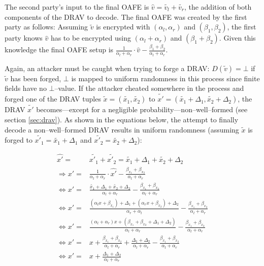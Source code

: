 The second party's input to the final OAFE is $\widehat{v} = \widetilde{v_l} +
\widetilde{v_r}$, the addition of both components of the DRAV to decode.  The
final OAFE was created by the first party as follows: Assuming $\widetilde{v}$
is encrypted with $(\alpha_l, \alpha_r)$ and $(\beta_1, \beta_2)$, the first
party knows $\widehat{v}$ has to be encrypted using $(\alpha_l + \alpha_r)$ and
$(\beta_1 + \beta_2)$.  Given this knowledge the final OAFE setup is
$\frac{1}{\alpha_l + \alpha_r} \cdot \widehat{v} - \frac{\beta_1 +
\beta_2}{\alpha_l + \alpha_r}$.

Again, an attacker must be caught when trying to forge a DRAV: $D(\widetilde{v})
= \bot$ if $\widetilde{v}$ has been forged, $\bot$ is mapped to uniform
randomness in this process since finite fields have no $\bot$--value. If the
attacker cheated somewhere in the process and forged one of the DRAV tuples
$\widetilde{x} = (\widetilde{x_1}, \widetilde{x_2})$ to $\widetilde{x'} =
(\widetilde{x_1} + \Delta_1, \widetilde{x_2} + \Delta_2)$, the DRAV
$\widetilde{x'}$ becomes---except for a negligible
probability---non--well--formed (see section \ref{sec:drav}). As shown in the
equations below, the attempt to finally decode a non--well--formed DRAV results
in uniform randomness (assuming $\widetilde{x}$ is forged to $\widetilde{x'_1} =
\widetilde{x_1} + \Delta_1$ and $\widetilde{x'_2} = \widetilde{x_2} +
\Delta_2$):

\begin{align*}
  \widehat{x'} = & \widetilde{x'_1} + \widetilde{x'_2} = \widetilde{x_1} +
  \Delta_1 + \widetilde{x_2} + \Delta_2 \\
  \Rightarrow x' = & \frac{1}{\alpha_l + \alpha_r} \cdot \widehat{x'} -
  \frac{\beta_{x_1} +
  \beta_{x_2}}{\alpha_l + \alpha_r} \\
  \Leftrightarrow x' = & \frac{\widetilde{x_1} + \Delta_1 +
  \widetilde{x_2} + \Delta_2}{\alpha_l + \alpha_r} -
  \frac{\beta_{x_1} +\beta_{x_2}}{\alpha_l + \alpha_r}\\
  \Leftrightarrow x' = & \frac{(\alpha_l x + \beta_{x_1}) + \Delta_1 +
  (\alpha_r x + \beta_{x_2}) + \Delta_2}{\alpha_r + \alpha_l} -
  \frac{\beta_{x_1} +\beta_{x_2}}{\alpha_l + \alpha_r} \\
  \Leftrightarrow x' = & \frac{(\alpha_l+\alpha_r)x + (\beta_{x_1}+\beta_{x_2} +
  \Delta_1+\Delta_2)}{\alpha_l+\alpha_r} -
  \frac{\beta_{x_1} +\beta_{x_2}}{\alpha_l + \alpha_r} \\
  \Leftrightarrow x' = & x + \frac{\beta_{x_1}+\beta_{x_2}}{\alpha_l+\alpha_r}
  + \frac{\Delta_1 + \Delta_2}{\alpha_l + \alpha_r} -
  \frac{\beta_{x_1}+\beta_{x_2}}{\alpha_l + \alpha_r} \\
  \Leftrightarrow x' = & x + \frac{\Delta_1 + \Delta_2}{\alpha_l + \alpha_r}\\
\end{align*}

